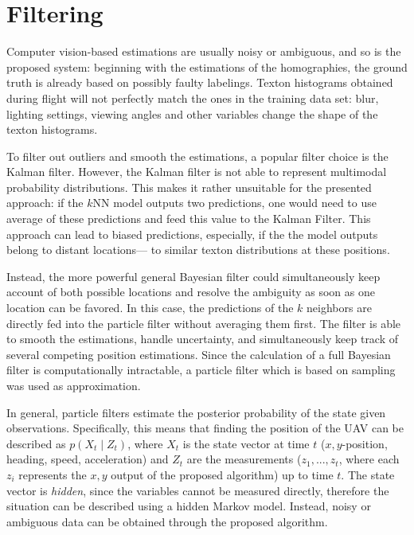 \section{Filtering}
\label{sec:filtering}


Computer vision-based estimations are usually noisy or ambiguous, and
so is the proposed system: beginning with the estimations of the
homographies, the ground truth is already based on possibly faulty
labelings. Texton histograms obtained during flight will not perfectly
match the ones in the training data set: blur, lighting settings,
viewing angles and other variables change the shape of the texton
histograms.

To filter out outliers and smooth the estimations, a popular filter
choice is the Kalman filter. However, the Kalman filter is not able to
represent multimodal probability distributions. This makes it rather
unsuitable for the presented approach: if the $k$NN model outputs two
predictions, one would need to use average of these predictions and
feed this value to the Kalman Filter. This approach can lead to biased
predictions, especially, if the the model outputs belong to distant
locations--- to similar texton distributions at these positions.

Instead, the more powerful general Bayesian filter could simultaneously keep
account of both possible locations and resolve the ambiguity as soon
as one location can be favored. In this case, the predictions of the
$k$ neighbors are directly fed into the particle filter without
averaging them first. The filter is able to smooth the estimations,
handle uncertainty, and simultaneously keep track of several competing
position estimations. Since the calculation of a full Bayesian filter is computationally intractable, a particle filter which is based on sampling was used as approximation. 

In general, particle filters estimate the posterior probability of the
state given observations. Specifically, this means that finding the
position of the UAV can be described as $p(X_t \mid Z_t)$, where $X_t$
is the state vector at time $t$ ($x,y$-position, heading, speed,
acceleration) and $Z_t$ are the measurements ($z_1, ..., z_t$, where
each $z_i$ represents the $x,y$ output of the proposed algorithm) up
to time $t$. The state vector is \emph{hidden}, since the variables
cannot be measured directly, therefore the situation can be described
using a hidden Markov model. Instead, noisy or ambiguous data can be
obtained through the proposed algorithm.

